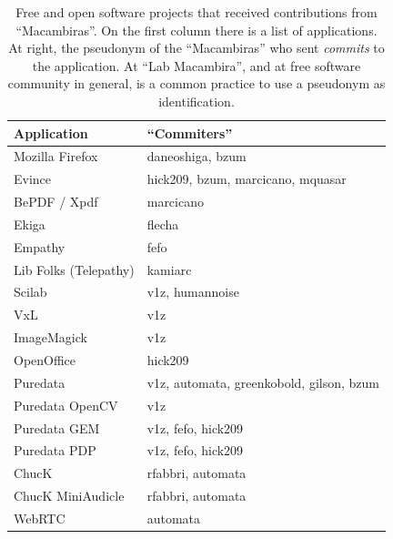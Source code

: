 \documentclass[letterpaper]{article}
\begin{document}

\begin{table}
  \caption{Free and open software projects that received contributions
    from ``Macambiras''. On the first column there is a list of
    applications. At right, the pseudonym of the
    ``Macambiras'' who sent \textit{commits} to the application. At
    ``Lab Macambira'', and at free software community in general, is a
    common practice to use a pseudonym as identification.}
    \begin{center}
    \small\begin{tabular}{|l|l|}
        \hline
        Application           & ``Commiters''                       \\
        \hline \hline
        Mozilla Firefox       & daneoshiga, bzum                    \\
        Evince                & hick209, bzum, marcicano, mquasar   \\
        BePDF / Xpdf          & marcicano                           \\
        Ekiga                 & flecha                              \\
        Empathy               & fefo                                \\
        Lib Folks (Telepathy) & kamiarc                             \\
        Scilab                & v1z, humannoise                     \\
        VxL                   & v1z                                 \\
        ImageMagick           & v1z                                 \\
        OpenOffice            & hick209                             \\
        Puredata              & v1z, automata, greenkobold, gilson, bzum \\
        Puredata OpenCV       & v1z                                 \\
        Puredata GEM          & v1z, fefo, hick209                  \\
        Puredata PDP          & v1z, fefo, hick209                  \\
        ChucK                 & rfabbri, automata                   \\
        ChucK MiniAudicle     & rfabbri, automata                   \\
        WebRTC                & automata                            \\

\end{tabular}
\end{center}
\end{table}
\end{document}
